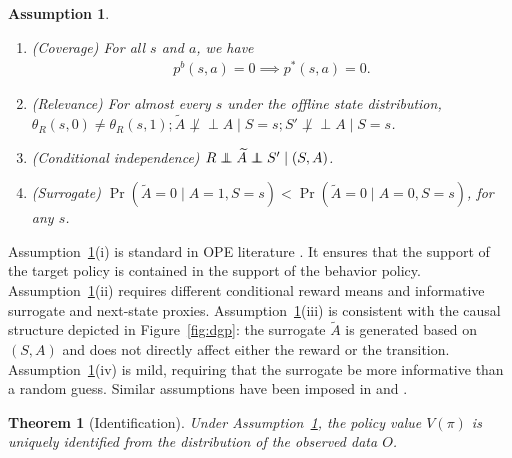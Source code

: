 \documentclass[12pt]{article}
\newcommand\independent{\protect\mathpalette{\protect\independenT}{\perp}}
\def\independenT#1#2{\mathrel{\rlap{$#1#2$}\mkern2mu{#1#2}}}
\newcommand{\0}{\boldsymbol{0}}
\newtheorem{theorem}{Theorem}
\newtheorem{assumption}{Assumption}[section]
\newcommand{\nind}{\mathrel{\not\perp\!\!\!\perp}}
\begin{document}
\begin{assumption}
\label{assump:latent_action_id}
\begin{enumerate}[label=(\roman*)]
\item (Coverage) For all $s$ and $a$, we have \begin{gather*}
    p^b(s,a)= 0 \implies p^*(s,a) = 0.
\end{gather*}
\item (Relevance) For almost every $s$ under the offline state distribution, $\theta_R(s,0)\ne\theta_R(s,1); \widetilde A\nind A\mid S=s; S'\nind A\mid S=s$.
\item (Conditional independence) $R\independent \widetilde A \independent S' \mid (S,A)$.
\item (Surrogate)  $\Pr(\widetilde A=0\mid A=1, S=s)< \Pr(\widetilde A=0\mid A=0, S=s)$, for any $s$. \label{cdn:1}

\end{enumerate}
\end{assumption}


Assumption~\ref{assump:latent_action_id}(i) is standard in OPE literature \citep{uehara2022review}. It ensures that the support of the target policy is contained in the support of the behavior policy.
Assumption~\ref{assump:latent_action_id}(ii) requires different conditional reward means and informative surrogate and next-state proxies. Assumption~\ref{assump:latent_action_id}(iii) is consistent with the causal structure depicted in Figure~\ref{fig:dgp}: the surrogate $\widetilde A$ is generated based on $(S, A)$ and does not directly affect either the reward or the transition. Assumption~\ref{assump:latent_action_id}(iv) is mild, requiring that the surrogate be more informative than a random guess. Similar assumptions have been imposed in \citet{hu2008identification} and \citet{zhou2024causal}.


\begin{theorem}[Identification]
\label{thm:identification}
Under Assumption~\ref{assump:latent_action_id}, the policy value $V(\pi)$ is uniquely identified from the distribution of the observed data $O$.
\end{theorem}
\end{document}
